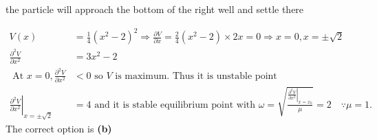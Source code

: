 \begin{enumerate}
\begin{tasks}
		\task[\textbf{D.}]the particle will approach the bottom of the right well and settle there
	\end{tasks}
	\begin{answer}
		\begin{align*}
		V(x)&=\frac{1}{4}\left(x^{2}-2\right)^{2} \Rightarrow \frac{\partial V}{\partial x}=\frac{2}{4}\left(x^{2}-2\right) \times 2 x=0 \Rightarrow x=0, x=\pm \sqrt{2}\\
		\frac{\partial^{2} V}{\partial x^{2}}&=3 x^{2}-2\\
		\text { At } x=0, \frac{\partial^{2} V}{\partial x^{2}}&<0 \text { so } V \text { is maximum. Thus it is unstable point }\\
		\left.\frac{\partial^{2} V}{\partial x^{2}}\right|_{x=\pm \sqrt{2}}&=4 \text { and it is stable equilibrium point with } \omega=\sqrt{\frac{\left.\frac{\partial^{2} V}{\partial x^{2}}\right|_{x=x_{0}}}{\mu}}=2 \quad \because \mu=1 \text {. }
		\end{align*}
		The correct option is \textbf{(b)}	
	\end{answer}
	

\end{enumerate}

